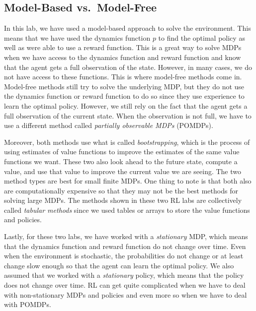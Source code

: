 \subsection*{Model-Based vs.\ Model-Free}
In this lab, we have used a model-based approach to solve the  environment.
This means that we have used the dynamics function $p$ to find the optimal policy as well as were able to use a reward function.
This is a great way to solve MDPs when we have access to the dynamics function and reward function and know that the agent gets a full observation of the state.
However, in many cases, we do not have access to these functions.
This is where model-free methods come in.
Model-free methods still try to solve the underlying MDP, but they do not use the dynamics function or reward function to do so since they use experience to learn the optimal policy.
However, we still rely on the fact that the agent gets a full observation of the current state.
When the observation is not full, we have to use a different method called \emph{partially observable MDPs} (POMDPs).

Moreover, both methods use what is called \emph{bootstrapping}, which is the process of using estimates of value functions to improve the estimates of the same value functions we want.
These two also look ahead to the future state, compute a value, and use that value to improve the current value we are seeing.
The two method types are best for small finite MDPs.
One thing to note is that both also are computationally expensive so that they may not be the best methods for solving large MDPs.
The methods shown in these two RL labs are collectively called \emph{tabular methods} since we used tables or arrays to store the value functions and policies.

Lastly, for these two labs, we have worked with a \emph{stationary} MDP, which means that the dynamics function and reward function do not change over time.
Even when the environment is stochastic, the probabilities do not change or at least change slow enough so that the agent can learn the optimal policy.
We also assumed that we worked with a \emph{stationary} policy, which means that the policy does not change over time.
RL can get quite complicated when we have to deal with non-stationary MDPs and policies and even more so when we have to deal with POMDPs.


